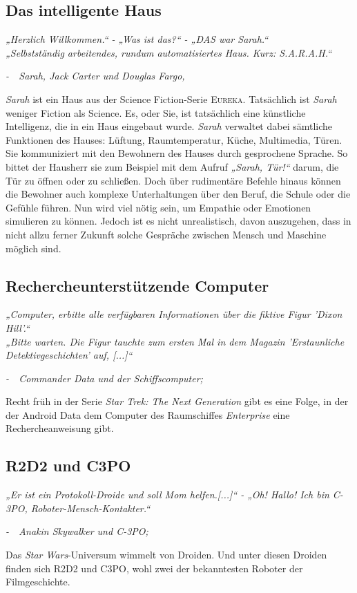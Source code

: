 \documentclass[12pt,twoside]{article}
\theoremstyle{plain}
\theoremstyle{definition}
\theoremstyle{remark}
\begin{document}
\subsection{Das intelligente Haus}
\label{ssec:sarah}
\textit{„Herzlich Willkommen.“ - „Was ist das?“ - „DAS war Sarah.“\\
        „Selbstständig arbeitendes, rundum automatisiertes Haus. Kurz: S.A.R.A.H.“}
\begin{flushright}
    \textit{-~~Sarah, Jack Carter und Douglas Fargo, \cite{EUR103}}
\end{flushright}
\textit{Sarah} ist ein Haus aus der Science Fiction-Serie \textsc{Eureka}.
Tatsächlich ist \textit{Sarah} weniger Fiction als Science.
Es, oder Sie, ist tatsächlich eine künstliche Intelligenz, die in ein Haus eingebaut wurde.
\textit{Sarah} verwaltet dabei sämtliche Funktionen des Hauses: Lüftung, Raumtemperatur, Küche, Multimedia, Türen.
Sie kommuniziert mit den Bewohnern des Hauses durch gesprochene Sprache.
So bittet der Hausherr sie zum Beispiel mit dem Aufruf \textit{„Sarah, Tür!“} darum, die Tür zu öffnen oder zu schließen.
Doch über rudimentäre Befehle hinaus können die Bewohner auch komplexe Unterhaltungen über den Beruf, die Schule oder die Gefühle führen.
Nun wird viel nötig sein, um Empathie oder Emotionen simulieren zu können.
Jedoch ist es nicht unrealistisch, davon auszugehen, dass in nicht allzu ferner Zukunft solche Gespräche zwischen Mensch und Maschine möglich sind.
\subsection{Rechercheunterstützende Computer}
\label{ssec:data}
\textit{„Computer, erbitte alle verfügbaren Informationen über die fiktive Figur 'Dixon Hill'.“\\
        „Bitte warten. Die Figur tauchte zum ersten Mal in dem Magazin 'Erstaunliche Detektivgeschichten' auf, [...]“}
\begin{flushright}
    \textit{-~~Commander Data und der Schiffscomputer; \cite{TNG112}}
\end{flushright}
Recht früh in der Serie \textit{Star Trek: The Next Generation} gibt es eine Folge, in der der Android Data dem Computer des Raumschiffes \textit{Enterprise} eine Rechercheanweisung gibt.

\subsection{R2D2 und C3PO}
\label{ssec:r2d2}
\textit{„Er ist ein Protokoll-Droide und soll Mom helfen.[...]“ - „Oh! Hallo! Ich bin C-3PO, Roboter-Mensch-Kontakter.“}
\begin{flushright}
    \textit{-~~Anakin Skywalker und C-3PO; \cite{SWEP1}}
\end{flushright}
Das \textit{Star Wars}-Universum wimmelt von Droiden.
Und unter diesen Droiden finden sich R2D2 und C3PO, wohl zwei der bekanntesten Roboter der Filmgeschichte.
\end{document}
